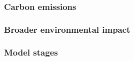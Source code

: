 \documentclass{article}
\begin{document}
\subsubsection{Carbon emissions}

\subsubsection{Broader environmental impact}


\subsubsection{Model stages}
\end{document}
